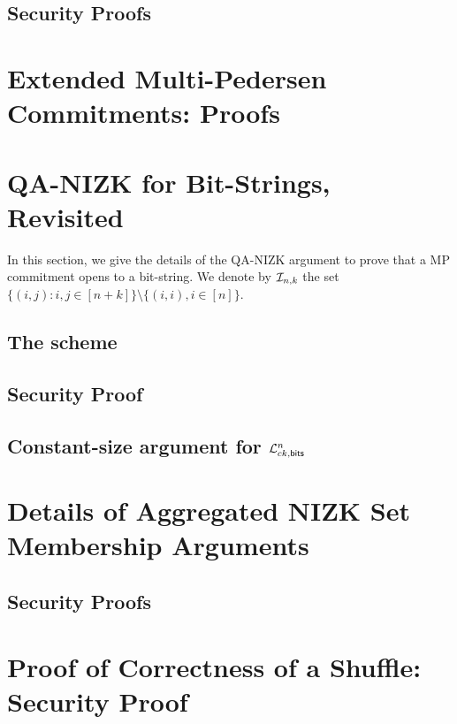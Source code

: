 \documentclass[11pt]{llncs}
\begin{document}
    \subsection{Security Proofs}
        



\appendix

\section{Extended Multi-Pedersen Commitments: Proofs} \label{app:mp}
    
\section{QA-NIZK for Bit-Strings, Revisited} \label{app:bits}
In this section, we give the details of the QA-NIZK argument to prove that a MP commitment opens to a bit-string. We denote by $\mathcal{I}_{n,k}$ the set $\{(i,j):i,j\in[n+k]\}\setminus\{(i,i),i\in[n]\}$.
    \subsection{The scheme} \label{sec:bits-scheme} 
        
    \subsection{Security Proof} \label{app:proofbits}
        
    \subsection{Constant-size argument for $\mathcal{L}_{ck,\mathsf{bits}}^n$} \label{app:bits-n}
        
        
\section{Details of Aggregated NIZK Set Membership Arguments} \label{app:bin-lang}
    
    \subsection{Security Proofs}
        
\section{Proof of Correctness of a Shuffle: Security Proof} \label{app:shuffle}
    
\end{document}
